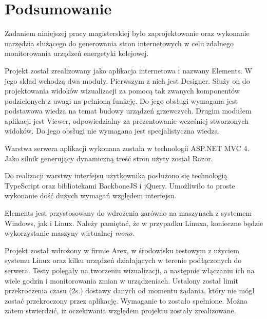 \chapter{Podsumowanie}

Zadaniem niniejszej pracy magisterskiej było zaprojektowanie oraz wykonanie narzędzia służącego do generowania stron internetowych w celu zdalnego monitorowania urządzeń energetyki kolejowej. 

Projekt został zrealizowany jako aplikacja internetowa i nazwany Elements. W jego skład wchodzą dwa moduły. Pierwszym z nich jest Designer. Służy on do projektowania widoków wizualizacji za pomocą tak zwanych komponentów podzielonych z uwagi na pełnioną funkcję. Do jego obsługi wymagana jest podstawowa wiedza na temat budowy urządzeń grzewczych. Drugim modułem aplikacji jest Viewer, odpowiedzialny za prezentowanie wcześniej stworzonych widoków. Do jego obsługi nie wymagana jest specjalistyczna wiedza.

Warstwa serwera aplikacji wykonana została w technologii ASP.NET MVC 4. Jako silnik generujący dynamiczną treść stron użyty został Razor. 

Do realizacji warstwy interfejsu użytkownika posłużono się technologią TypeScript oraz bibliotekami BackboneJS i jQuery. Umożliwiło to proste wykonanie dość dużych wymagań względem interfejsu.

Elements jest przystosowany do wdrożenia zarówno na maszynach z systemem Windows, jak i Linux. Należy pamiętać, że w przypadku Linuxa, konieczne będzie wykorzystanie maszyny wirtualnej \textit{mono}.

Projekt został wdrożony w firmie Arex, w środowisku testowym z użyciem systemu Linux oraz kilku urządzeń działających w terenie podłączonych do serwera. Testy polegały na tworzeniu wizualizacji, a następnie włączaniu ich na wiele godzin i monitorowania zmian w urządzeniach. Ustalony został limit przekroczenia czasu (2s.) dostawy danych od momentu żądania, który nie mógł zostać przekroczony przez aplikację. Wymaganie to zostało spełnione. Można zatem stwierdzić, iż oczekiwania względem projektu zostały zrealizowane.